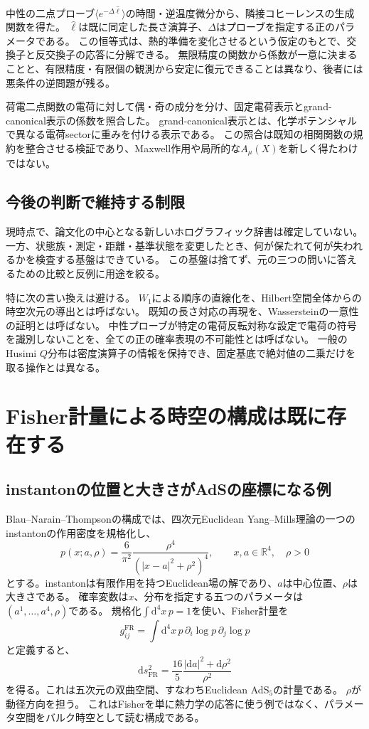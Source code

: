 \documentclass[a4paper,11pt]{ltjsarticle}
\numberwithin{equation}{section}
\newcommand{\dd}{\mathrm d}
\newcommand{\FR}{\mathrm{FR}}
\begin{document}
中性の二点プローブ$\langle e^{-\Delta\hat\ell}\rangle$の時間・逆温度微分から、隣接コヒーレンスの生成関数を得た。
$\hat\ell$は既に同定した長さ演算子、$\Delta$はプローブを指定する正のパラメータである。
この恒等式は、熱的準備を変化させるという仮定のもとで、交換子と反交換子の応答に分解できる。
無限精度の関数から係数が一意に決まることと、有限精度・有限個の観測から安定に復元できることは異なり、後者には悪条件の逆問題が残る。

荷電二点関数の電荷に対して偶・奇の成分を分け、固定電荷表示とgrand-canonical表示の係数を照合した\cite{BNR,GST}。
grand-canonical表示とは、化学ポテンシャルで異なる電荷sectorに重みを付ける表示である。
この照合は既知の相関関数の規約を整合させる検証であり、Maxwell作用や局所的な$A_\mu(X)$を新しく得たわけではない。

\subsection{今後の判断で維持する制限}
現時点で、論文化の中心となる新しいホログラフィック辞書は確定していない。
一方、状態族・測定・距離・基準状態を変更したとき、何が保たれて何が失われるかを検査する基盤はできている。
この基盤は捨てず、元の三つの問いに答えるための比較と反例に用途を絞る。

特に次の言い換えは避ける。
$W_1$による順序の直線化を、Hilbert空間全体からの時空次元の導出とは呼ばない。
既知の長さ対応の再現を、Wassersteinの一意性の証明とは呼ばない。
中性プローブが特定の電荷反転対称な設定で電荷の符号を識別しないことを、全ての正の確率表現の不可能性とは呼ばない。
一般のHusimi $Q$分布は密度演算子の情報を保持でき、固定基底で絶対値の二乗だけを取る操作とは異なる。

\section{Fisher計量による時空の構成は既に存在する}
\subsection{instantonの位置と大きさがAdSの座標になる例}
Blau--Narain--Thompsonの構成では、四次元Euclidean Yang--Mills理論の一つのinstantonの作用密度を規格化し、
\begin{equation}
 p(x;a,\rho)=\frac6{\pi^2}\frac{\rho^4}{(|x-a|^2+\rho^2)^4},
 \qquad x,a\in\mathbb R^4,\quad \rho>0
 \label{eq:instanton}
\end{equation}
とする\cite{BNT}。instantonは有限作用を持つEuclidean場の解であり、$a$は中心位置、$\rho$は大きさである。
確率変数は$x$、分布を指定する五つのパラメータは$(a^1,\ldots,a^4,\rho)$である。
規格化$\int\dd^4x\,p=1$を使い、Fisher計量を
\begin{equation}
 g^{\FR}_{ij}=\int\dd^4x\,p\,\partial_i\log p\,\partial_j\log p
 \label{eq:fisher}
\end{equation}
と定義すると、
\begin{equation}
 \dd s_{\FR}^2=\frac{16}{5}\frac{|\dd a|^2+\dd\rho^2}{\rho^2}
 \label{eq:ads5}
\end{equation}
を得る。これは五次元の双曲空間、すなわちEuclidean AdS$_5$の計量である。
$\rho$が動径方向を担う。
これはFisherを単に熱力学の応答に使う例ではなく、パラメータ空間をバルク時空として読む構成である。
\end{document}
